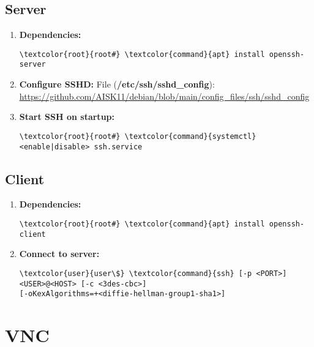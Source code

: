 \documentclass[10pt, a4paper, onecolumn, openany]{book} %
\begin{document}
\subsection{Server}
\begin{enumerate}
    \item \textbf{Dependencies:}
\begin{Verbatim}[commandchars=\\\{\}]
\textcolor{root}{root#} \textcolor{command}{apt} install openssh-server
\end{Verbatim}
    \item \textbf{Configure SSHD:}
    \newline File (\textbf{\textcolor{file}{/etc/ssh/sshd\_config}}):
\newline \underline{\url{https://github.com/AISK11/debian/blob/main/config_files/ssh/sshd_config}}
    \item \textbf{Start SSH on startup:}
\begin{Verbatim}[commandchars=\\\{\}]
\textcolor{root}{root#} \textcolor{command}{systemctl} <enable|disable> ssh.service
\end{Verbatim}
\end{enumerate}
\subsection{Client}
\begin{enumerate}
    \item \textbf{Dependencies:}
\begin{Verbatim}[commandchars=\\\{\}]
\textcolor{root}{root#} \textcolor{command}{apt} install openssh-client
\end{Verbatim}
    \item \textbf{Connect to server:}
\begin{Verbatim}[commandchars=\\\{\}]
\textcolor{user}{user\$} \textcolor{command}{ssh} [-p <PORT>] <USER>@<HOST> [-c <3des-cbc>] 
[-oKexAlgorithms=+<diffie-hellman-group1-sha1>]
\end{Verbatim}
\end{enumerate}
\section{VNC}
\end{document}
